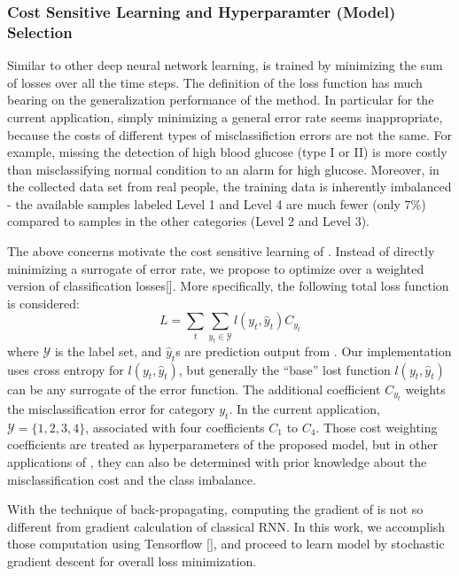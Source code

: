 \subsubsection{Cost Sensitive Learning and Hyperparamter (Model) Selection}
Similar to other deep neural network learning, \modelname is trained by minimizing the sum of losses over all the time steps.
The definition of the loss function has much bearing on the generalization performance of the method.
In particular for the current application, simply minimizing a general error rate seems inappropriate, because the costs of different types of misclassifiction errors are not the same.
For example, missing the detection of high blood glucose (type I or II) is more costly than misclassifying normal condition to an alarm for high glucose.
Moreover, in the collected data set from real people, the training data is inherently imbalanced - the available samples labeled Level 1 and Level 4 are much fewer (only 7\%) compared to samples in the other categories (Level 2 and Level 3).

The above concerns motivate the cost sensitive learning of \modelname.
Instead of directly minimizing a surrogate of error rate, we propose to optimize over a weighted version of classification losses[].
More specifically, the following total loss function is considered:
\begin{equation}
L = \sum_{t} \sum_{y_t \in \mathcal{Y}} l(y_t,\hat{y}_t)C_{y_t}
\end{equation}
where $\mathcal{Y}$ is the label set, and $\hat{y}_t$s are prediction output from \modelname.
Our implementation uses cross entropy for $l(y_t,\hat{y}_t)$, but generally the ``base'' lost function $l(y_t,\hat{y}_t)$ can be any surrogate of the error function.
The additional coefficient $C_{y_t}$ weights the misclassification error for category $y_t$.
In the current application, $\mathcal{Y} = \{1,2,3,4\}$, associated with four coefficients $C_1$ to $C_4$.
Those cost weighting coefficients are treated as hyperparameters of the proposed model, but in other applications of \modelname, they can also be determined with prior knowledge about the misclassification cost and the class imbalance.

With the technique of back-propagating, computing the gradient of \modelname is not so different from gradient calculation of classical RNN.
In this work, we accomplish those computation using Tensorflow [], and proceed to learn \modelname model by stochastic gradient descent for overall loss minimization.

